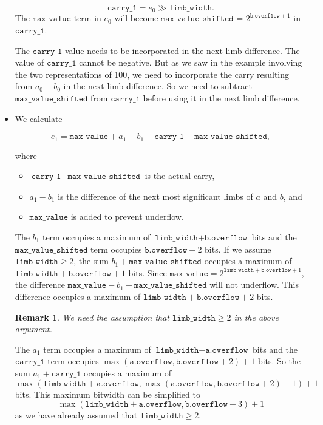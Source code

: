 \documentclass[a4paper, 12pt]{article}
\newtheorem*{remark}{Remark}
\begin{document}
\begin{itemize}
    $$\texttt{carry\_1} = e_0 \gg \texttt{limb\_width}.$$
    The $\texttt{max\_value}$ term in $e_0$ will become $\texttt{max\_value\_shifted}$ = $2^{\texttt{b.overflow}+1}$ in $\texttt{carry\_1}$.
    
    The $\texttt{carry\_1}$ value needs to be incorporated in the next limb difference. The value of $\texttt{carry\_1}$ cannot be negative. But as we saw in the example involving the two representations of 100, we need to incorporate the carry resulting from $a_0 - b_0$ in the next limb difference. So we need to subtract $\texttt{max\_value\_shifted}$ from $\texttt{carry\_1}$ before using it in the next limb difference.

  \item We calculate 

    $$e_1 = \texttt{max\_value} + a_1 - b_1 + \texttt{carry\_1} - \texttt{max\_value\_shifted},$$

    where
    \begin{itemize}
      \item $\texttt{carry\_1} - \texttt{max\_value\_shifted}$ is the actual carry,
      \item $a_1 - b_1$ is the difference of the next most significant limbs of $a$ and $b$, and
      \item $\texttt{max\_value}$ is added to prevent underflow.
    \end{itemize}
    
    The $b_1$ term occupies a maximum of $\texttt{limb\_width} + \texttt{b.overflow}$ bits and the $\texttt{max\_value\_shifted}$ term occupies $\texttt{b.overflow} + 2$ bits. If we assume $\texttt{limb\_width} \ge 2$, the sum $b_1 + \texttt{max\_value\_shifted}$ occupies a maximum of $\texttt{limb\_width} + \texttt{b.overflow} + 1$ bits. Since $\texttt{max\_value} = 2^{\texttt{limb\_width}+\texttt{b.overflow}+1}$, the difference $\texttt{max\_value} - b_1 - \texttt{max\_value\_shifted}$ will not underflow. This difference occupies a maximum of $\texttt{limb\_width} + \texttt{b.overflow} + 2$ bits.

    \begin{remark}
    We need the assumption that $\texttt{limb\_width} \ge 2$ in the above argument.
    \end{remark}

    The $a_1$ term occupies a maximum of $\texttt{limb\_width} + \texttt{a.overflow}$ bits and the $\texttt{carry\_1}$ term occupies $\max(\texttt{a.overflow}, \texttt{b.overflow} + 2) + 1$ bits. So the sum $a_1 + \texttt{carry\_1}$ occupies a maximum of 
    $$\max(\texttt{limb\_width} + \texttt{a.overflow}, \max(\texttt{a.overflow}, \texttt{b.overflow} + 2) + 1) + 1$$
    bits. This maximum bitwidth can be simplified to 
    $$\max(\texttt{limb\_width} + \texttt{a.overflow}, \texttt{b.overflow} + 3) + 1$$
    as we have already assumed that $\texttt{limb\_width} \ge 2$.
    

\end{itemize}
\end{document}
